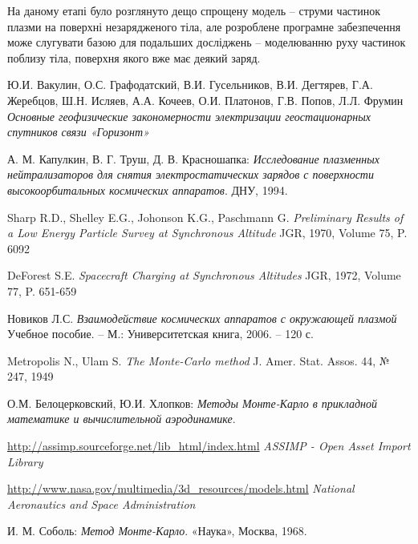 \documentclass[a4paper,12pt]{article}
\begin{document}
На даному етапі було розглянуто дещо спрощену модель -- струми частинок плазми на поверхні незарядженого тіла, але розроблене програмне забезпечення може слугувати базою для подальших досліджень -- моделюванню руху частинок поблизу тіла, поверхня якого вже має деякий заряд.


\newpage

\begin{thebibliography}{9}

  Ю.И. Вакулин, О.С. Графодатский, В.И. Гусельников, В.И. Дегтярев, Г.А. Жеребцов, Ш.Н. Исляев, А.А. Кочеев, О.И. Платонов, Г.В. Попов, Л.Л. Фрумин
  \emph{Основные геофизические закономерности электризации геостационарных спутников связи «Горизонт»}

  А. М. Капулкин, В. Г. Труш, Д. В. Красношапка:
  \emph{Исследование плазменных нейтрализаторов для снятия электростатических зарядов с поверхности высокоорбитальных космических аппаратов}.
  ДНУ, 1994.

  Sharp R.D., Shelley E.G., Johonson K.G., Paschmann G.
  \emph{Preliminary Results of a Low Energy Particle Survey at Synchronous Altitude}
  JGR, 1970, Volume 75, P. 6092

  DeForest S.E.
  \emph{Spacecraft Charging at Synchronous Altitudes}
  JGR, 1972, Volume 77, P. 651-659

  Новиков Л.С.
  \emph{Взаимодействие космических аппаратов с окружающей плазмой}
  Учебное пособие. -- М.: Университетская книга, 2006. -- 120 с.
  
  Metropolis N., Ulam S.
  \emph{The Monte-Carlo method}
  J. Amer. Stat. Assos. 44,  № 247, 1949

  О.М. Белоцерковский, Ю.И. Хлопков:
  \emph{Методы Монте-Карло в прикладной математике и вычислительной аэродинамике}.

  \url{http://assimp.sourceforge.net/lib_html/index.html}
  \emph{ASSIMP - Open Asset Import Library}
  
  \url{http://www.nasa.gov/multimedia/3d_resources/models.html}
  \emph{National Aeronautics and Space Administration}
  
  И. М. Соболь:
  \emph{Метод Монте-Карло}.
  «Наука», Москва, 1968.

\end{thebibliography}
\end{document}
